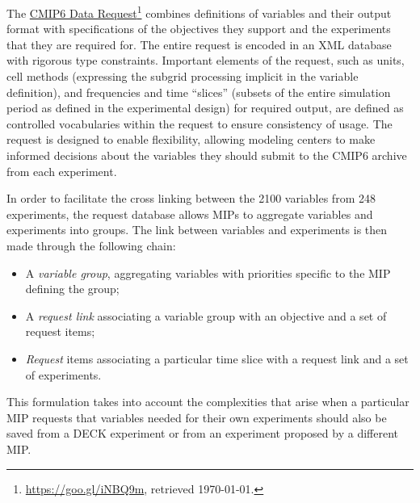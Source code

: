 \documentclass[gmd,manuscript]{copernicus}
\newcommand{\urlref}[2] {\href{#1}{#2}\footnote{\url{#1}, retrieved \today.}}
\begin{document}
The \urlref{https://goo.gl/iNBQ9m}{CMIP6 Data Request}
\citep{ref:juckesetal2015} combines definitions of variables and their
output format with specifications of the objectives they support and
the experiments that they are required for. The entire request is
encoded in an XML database with rigorous type constraints. Important
elements of the request, such as units, cell methods (expressing the
subgrid processing implicit in the variable definition), and
frequencies and time ``slices'' (subsets of the entire simulation
period as defined in the experimental design) for required output, are
defined as controlled vocabularies within the request to ensure
consistency of usage. The request is designed to enable flexibility,
allowing modeling centers to make informed decisions about the
variables they should submit to the CMIP6 archive from each
experiment.



In order to facilitate the cross linking between the 2100 variables
from 248 experiments, the request database allows MIPs to aggregate
variables and experiments into groups. The link between variables and
experiments is then made through the following chain:

\begin{itemize}
\item A \emph{variable group}, aggregating variables with priorities
  specific to the MIP defining the group;
\item A \emph{request link} associating a variable group with an
  objective and a set of request items;
\item \emph{Request} items associating a particular time slice with a
  request link and a set of experiments.
\end{itemize}

This formulation takes into account the complexities that arise when a
particular MIP requests that variables needed for their own
experiments should also be saved from a DECK experiment or from an
experiment proposed by a different MIP.
\end{document}
